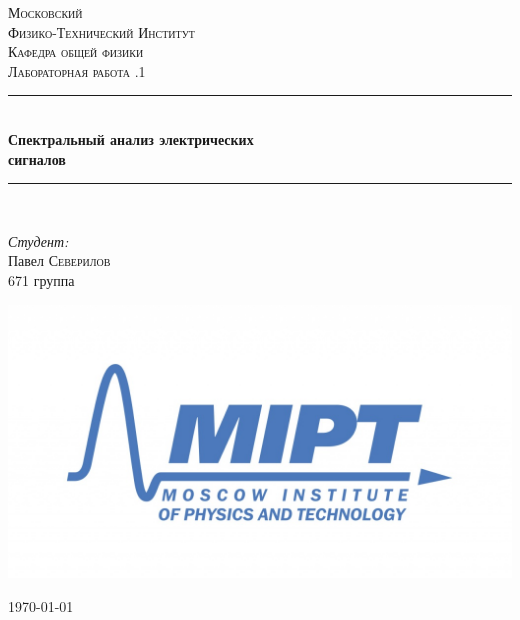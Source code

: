 \documentclass[a4paper, 12pt]{article}
\newenvironment{bottompar}{\par\vspace*{\fill}}{\clearpage}
\begin{document}
\begin{titlepage}

\newcommand{\HRule}{\rule{\linewidth}{0.5mm}} %

\center %
 

\textsc{\LARGE Московский \\[0.5cm] Физико-Технический Институт}\\[1,5cm] %
\textsc{\Large Кафедра общей физики}\\[0.5cm] %
\textsc{\large Лабораторная работа .1}\\[0.5cm] %


\HRule
\\[0.4cm]
{ \huge \bfseries Спектральный анализ электрических  \\[0.5cm]сигналов}
\\[0.2cm] %
\HRule
\\[1.5cm]


 

	\begin{flushleft} \large
		\emph{Студент:}\\
		Павел \textsc{Северилов} \\
		671 группа
	\end{flushleft}

\begin{bottompar}
	\begin{center}
		\includegraphics[width = 80 mm]{logo.jpg}
	\end{center}
	{\large \today}

\end{bottompar}
\vfill %

\end{titlepage}
\end{document}
